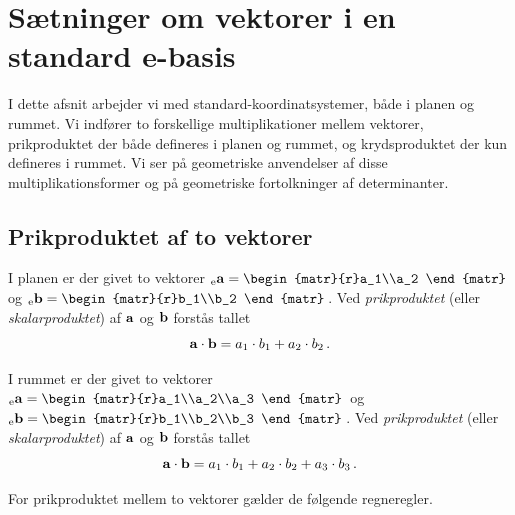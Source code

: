 \section{Sætninger om vektorer i en standard e-basis}
I dette afsnit arbejder vi med standard-koordinatsystemer, både i planen og rummet. Vi indfører to forskellige multiplikationer mellem vektorer, prikproduktet der både defineres i planen og rummet, og krydsproduktet der kun defineres i rummet. Vi ser på geometriske anvendelser af disse multiplikationsformer og på geometriske fortolkninger af determinanter.
\subsection{Prikproduktet af to vektorer}

\begin{definition}
I planen er der givet to vektorer
${_\mathrm{e}\mathbf{a}}=\begin{matr}{r}a_1\\a_2 \end{matr}\,$ og
${_\mathrm{e}\mathbf{b}}=\begin{matr}{r}b_1\\b_2 \end{matr}\,$. Ved \textit{prikproduktet} (eller \textit{skalarproduktet}) af $\mathbf{a}$ og $\mathbf{b}$  forstås tallet 
\begin{equation}
\mathbf{a} \cdot \mathbf{b}=a_1\cdot b_1+a_2\cdot b_2\,.
\end{equation}
\end{definition}

\begin{definition}
I rummet er der givet to vektorer
${_\mathrm{e}\mathbf{a}}=\begin{matr}{r}a_1\\a_2\\a_3 \end{matr}\,$ og
${_\mathrm{e}\mathbf{b}}=\begin{matr}{r}b_1\\b_2\\b_3 \end{matr}\,$. Ved \textit{prikproduktet} (eller \textit{skalarproduktet}) af $\mathbf{a}$ og $\mathbf{b}$  forstås tallet 
\begin{equation}
\mathbf{a} \cdot \mathbf{b}=a_1\cdot b_1+a_2\cdot b_2+a_3\cdot b_3\,.
\end{equation}
\end{definition}

For prikproduktet mellem to vektorer gælder de følgende regneregler.\\


